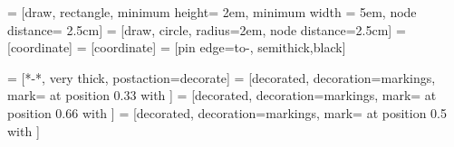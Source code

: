  = [draw, rectangle, minimum height= 2em, minimum width = 5em, node distance= 2.5cm]
 = [draw, circle, radius=2em, node distance=2.5cm]
 = [coordinate]
 = [coordinate]
 = [pin edge={to-, semithick,black}]

\usetikzlibrary{decorations.markings}
 = [*-*, very thick, postaction={decorate}] %
 = [decorated, decoration={markings, mark= at position 0.33 with {\arrow{>}}}]
 = [decorated, decoration={markings, mark= at position 0.66 with {\arrow{>}}}]
 = [decorated, decoration={markings, mark= at position 0.5 with {\arrow{>}}}]